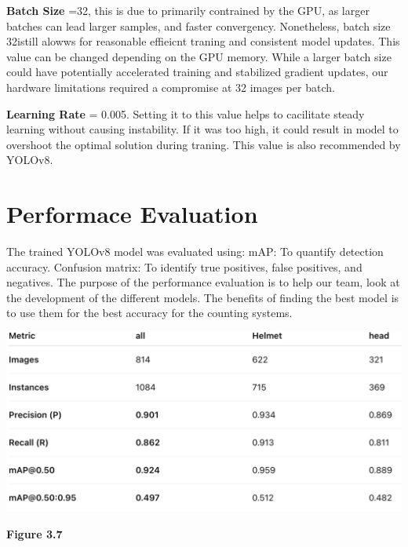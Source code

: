 \textbf{Batch Size} =32, this is due to primarily contrained by the GPU, as larger batches can lead larger samples, and faster convergency. Nonetheless, batch size 32istill alowws for reasonable effieicnt traning and consistent model updates. This value can be changed depending on the GPU memory. While a larger batch size could have potentially accelerated training and stabilized gradient updates, our hardware limitations required a compromise at 32 images per batch.

\textbf{Learning Rate} = 0.005. Setting it to this value helps to cacilitate steady learning without causing instability. If it was too high, it could result in model to overshoot the optimal solution during traning. This value is also recommended by YOLOv8.



\section{Performace Evaluation}

\noindent\hspace{2.5em}The trained YOLOv8 model was evaluated using:
mAP: To quantify detection accuracy.
Confusion matrix: To identify true positives, false positives, and negatives.
The purpose of the performance evaluation is to help our team, look at the development of the different models. The benefits of finding the best model is to use them for the best accuracy for the counting systems.

\begin{center}
	\includegraphics[width=1\textwidth]{performance.eva.png}
	
	\vspace{0.5em}
	\textbf{Figure 3.7}
\end{center}

